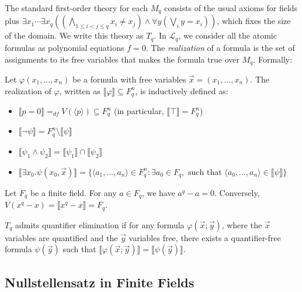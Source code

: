 \documentclass[envcountsect]{llncs}
\begin{document}
The standard first-order theory for each $M_q$ consists of the usual axioms for fields \cite{modelbook} plus $\exists x_1\cdots\exists x_q ((\bigwedge_{1\leq i< j \leq q} x_i \neq x_j )\wedge \forall y(\bigvee_i y = x_i))$, which fixes the size of the domain. We write this theory as $T_q$. In $\mathcal{L}_q$, we consider all the atomic formulas as polynomial equations $f=0$. The {\em realization} of a formula is the set of assignments to its free variables that makes the formula true over $M_q$. Formally:

\begin{definition}[Realization]
Let $\varphi(x_1,...,x_n)$ be a formula with free variables $\vec x = (x_1,...,x_n)$. The realization of $\varphi$, written as $\llbracket \varphi \rrbracket \subseteq F_q^n$, is inductively defined as:
\begin{itemize}
\item $\llbracket p = 0\rrbracket =_{df} V(\langle p\rangle) \subseteq F_q^n$ (in particular, $\llbracket \top\rrbracket = F_q^n$)

\item $\llbracket \neg \psi \rrbracket = F_q^n\setminus \llbracket \psi\rrbracket$

\item $\llbracket \psi_1\wedge \psi_2 \rrbracket = \llbracket \psi_1\rrbracket \cap \llbracket \psi_2\rrbracket$

\item $\llbracket\exists x_0. \psi(x_0,\vec x) \rrbracket = \{\langle a_1,...,a_n\rangle \in F_q^n: \exists a_0\in F_q, \mbox{ such that } \langle a_0,...,a_n\rangle \in \llbracket\psi\rrbracket \}$
\end{itemize}
\end{definition}
\begin{proposition}
Let $F_q$ be a finite field. For any $a\in F_q$, we have $a^q-a=0$. Conversely, $V(x^q-x) = \llbracket x^q-x\rrbracket = F_q$.
\end{proposition}
\begin{definition}
$T_q$ admits quantifier elimination if for any formula $\varphi(\vec x;\vec y)$, where the $\vec x$ variables are quantified and the $\vec y$ variables free, there exists a quantifier-free formula $\psi(\vec y)$ such that $\llbracket\varphi(\vec x; \vec y)\rrbracket = \llbracket \psi(\vec y) \rrbracket$. 
\end{definition}

\subsection{Nullstellensatz in Finite Fields}
\end{document}
